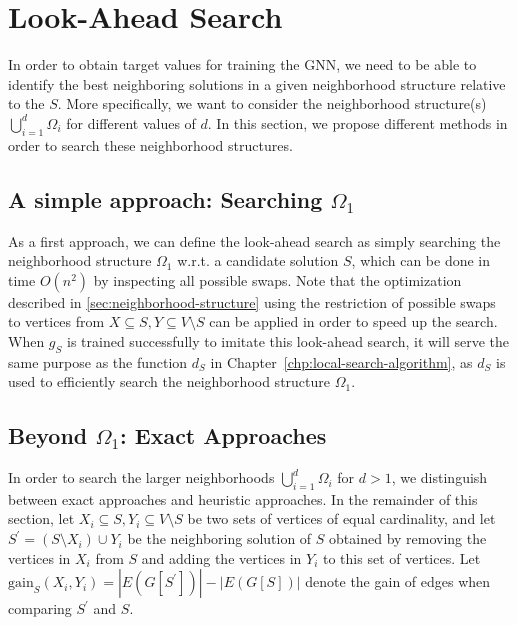 \documentclass[draft,final]{vutinfth} %
\begin{document}
\section{Look-Ahead Search}\label{sec:lookahead-search}

In order to obtain target values for training the GNN, we need to be able to identify the best neighboring solutions in a given neighborhood structure relative to the $S$. More specifically, we want to consider the neighborhood structure(s) $\bigcup_{i=1}^d \Omega_i$ for different values of $d$. In this section, we propose different methods in order to search these neighborhood structures. 

\subsection{A simple approach: Searching $\Omega_1$}

As a first approach, we can define the look-ahead search as simply searching the neighborhood structure $\Omega_1$ w.r.t. a candidate solution $S$, which can be done in time $O(n^2)$ by inspecting all possible swaps. Note that the optimization described in \ref{sec:neighborhood-structure} using the restriction of possible swaps to vertices from $X \subseteq S, Y \subseteq V \setminus S$ can be applied in order to speed up the search. 
When $g_S$ is trained successfully to imitate this look-ahead search, it will serve the same purpose as the function $d_S$ in Chapter~\ref{chp:local-search-algorithm}, as $d_S$ is used to efficiently search the neighborhood structure $\Omega_1$. 

\subsection{Beyond $\Omega_1$: Exact Approaches}

In order to search the larger neighborhoods $\bigcup_{i=1}^d \Omega_i$ for $d > 1$, we distinguish between exact approaches and heuristic approaches. 
In the remainder of this section, let $X_i \subseteq S, Y_i \subseteq V\setminus S$ be two sets of vertices of equal cardinality, and let $S^\prime = (S \setminus X_i) \cup Y_i$ be the neighboring solution of $S$ obtained by removing the vertices in $X_i$ from $S$ and adding the vertices in $Y_i$ to this set of vertices. Let $\mathrm{gain}_S(X_i, Y_i) = |E(G[S^\prime])| - |E(G[S])|$ denote the gain of edges when comparing $S^\prime$ and $S$.   
\end{document}
